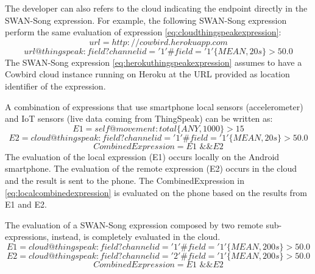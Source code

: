The developer can also refers to the cloud indicating the endpoint directly in the SWAN-Song expression. For example, the following SWAN-Song expression perform the same evaluation of expression \ref{eq:cloudthingspeakexpression}:
\begin{equation} \label{eq:herokuthingspeakexpressionurl}
url=http://cowbird.herokuapp.com
\end{equation}
\begin{equation} \label{eq:herokuthingspeakexpression}
url@thingspeak: field?channelid='1'\#field='1'\big\{MEAN,20s\big\} > 50.0
\end{equation}
The SWAN-Song expression \ref{eq:herokuthingspeakexpression} assumes to have a Cowbird cloud instance running on Heroku at the URL provided as location identifier of the expression.

A combination of expressions that use smartphone local sensors (accelerometer) and IoT sensors (live data coming from ThingSpeak) can be written as:
\begin{equation}
E1 = self@movement:total\big\{ANY,1000\big\} > 15 
\end{equation}
\begin{equation}
E2 = cloud@thingspeak:field?channelid='1'\#field='1'\big\{MEAN,20s\big\} > 50.0
\end{equation}
\begin{equation} \label{eq:localcombinedexpression}
CombinedExpression = E1 \text{ \&\& } E2
\end{equation}
The evaluation of the local expression (E1) occurs locally on the Android smartphone. The evaluation of the remote expression (E2) occurs in the cloud and the result is sent to the phone. The CombinedExpression in \ref{eq:localcombinedexpression} is evaluated on the phone based on the results from E1 and E2. 

The evaluation of a SWAN-Song expression composed by two remote sub-expressions, instead, is completely evaluated in the cloud.
\begin{equation}
E1 = cloud@thingspeak:field?channelid='1' \#field='1'\big\{MEAN,200s\big\} > 50.0
\end{equation}
\begin{equation}
E2 = cloud@thingspeak:field?channelid='2' \#field='1'\big\{MEAN,200s\big\} > 50.0
\end{equation}
\begin{equation} \label{eq:remotecombinedexpression}
CombinedExpression = E1 \text{ \&\& } E2
\end{equation}

